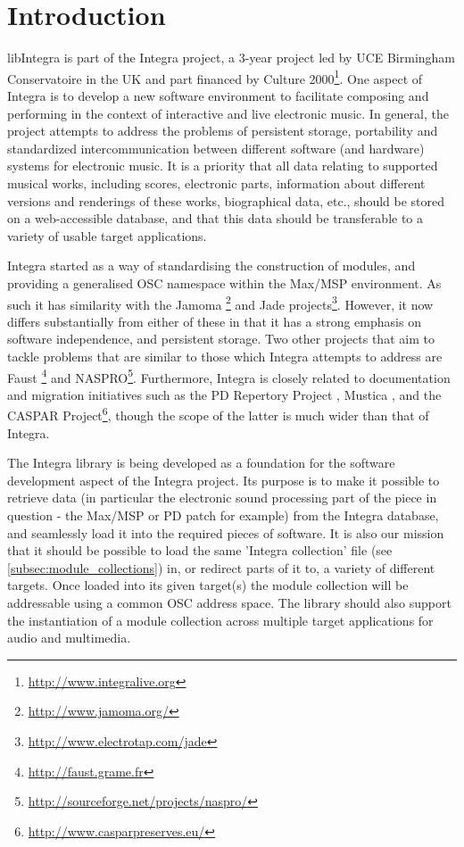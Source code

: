 
\section{Introduction}\label{sec:introduction}

libIntegra is part of the Integra project, a 3-year project led by UCE
Birmingham Conservatoire in the UK and part financed by Culture
2000\footnote{\url{http://www.integralive.org}}. One aspect of Integra
is to develop a new software environment to facilitate composing and
performing in the context of interactive and live electronic music. In
general, the project attempts to address the problems of persistent
storage, portability and standardized intercommunication between
different software (and hardware) systems for electronic music. It is
a priority that all data relating to supported musical works,
including scores, electronic parts, information about different
versions and renderings of these works, biographical data, etc.,
should be stored on a web-accessible database, and that this data
should be transferable to a variety of usable target applications.

Integra started as a way of standardising the construction of modules,
and providing a generalised OSC namespace within the Max/MSP
environment. As such it has similarity with the Jamoma
\citep{Place:06}\footnote{\url{http://www.jamoma.org/}} and Jade
projects\footnote{\url{http://www.electrotap.com/jade}}. However, it
now differs substantially from either of these in that it has a strong
emphasis on software independence, and persistent storage. Two other
projects that aim to tackle problems that are similar to those which
Integra attempts to address are Faust \citep{Orlarey:04,
  Orlarey:02}\footnote{\url{http://faust.grame.fr}} and
NASPRO\footnote{\url{http://sourceforge.net/projects/naspro/}}.
Furthermore, Integra is closely related to documentation and migration
initiatives such as the PD Repertory Project \citep{Puckette:01},
Mustica \citep{Bachimont:03}, and the CASPAR
Project\footnote{\url{http://www.casparpreserves.eu/}}, though the
scope of the latter is much wider than that of Integra.

The Integra library is being developed as a foundation for the
software development aspect of the Integra project. Its purpose is to
make it possible to retrieve data (in particular the electronic sound
processing part of the piece in question - the Max/MSP or PD patch for
example) from the Integra database, and seamlessly load it into the
required pieces of software. It is also our mission that it should be
possible to load the same 'Integra collection' file (see
\ref{subsec:module_collections}) in, or redirect parts of it to, a
variety of different targets. Once loaded into its given target(s) the
module collection will be addressable using a common OSC address
space. The library should also support the instantiation of a module
collection across multiple target applications for audio and
multimedia.

